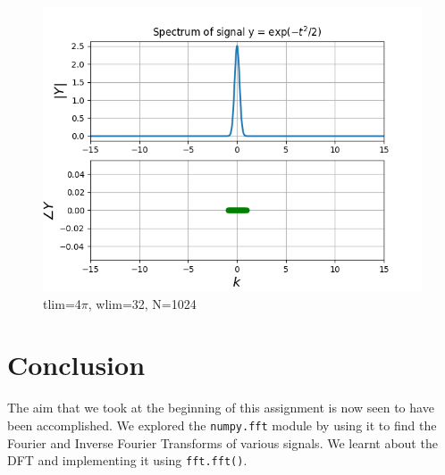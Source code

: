 \documentclass[11pt, a4paper]{article}
\begin{document}
   
\begin{figure}[!tbh]
   	\centering
  \includegraphics[scale=0.5]{a8_12.png} 
    \caption{tlim=4$\pi$, wlim=32, N=1024} 	
   \end{figure}   

\section{Conclusion}
The aim that we took at the beginning of this assignment is now seen to have been accomplished. We explored the \texttt{numpy.fft} module by using it to find the Fourier and Inverse Fourier Transforms of various signals. We learnt about the DFT and implementing it using \texttt{fft.fft()}. 
\end{document}

